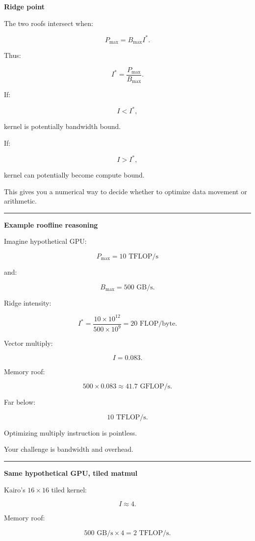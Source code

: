 \textbf{Ridge point}

The two roofs intersect when:

\[
P_{\max}
=
B_{\max}I^*.
\]

Thus:

\[
\boxed{
I^*
=
\frac{
P_{\max}
}{
B_{\max}
}.
}
\]

If:

\[
I<I^*,
\]

kernel is potentially bandwidth bound.

If:

\[
I>I^*,
\]

kernel can potentially become compute bound.

This gives you a numerical way to decide whether to optimize data movement or arithmetic.

\begin{center}\rule{0.5\linewidth}{0.5pt}\end{center}

\textbf{Example roofline reasoning}

Imagine hypothetical GPU:

\[
P_{\max}=10\text{ TFLOP/s}
\]

and:

\[
B_{\max}=500\text{ GB/s}.
\]

Ridge intensity:

\[
I^*
=
\frac{
10\times10^{12}
}{
500\times10^9
}
=
20\text{ FLOP/byte}.
\]

Vector multiply:

\[
I=0.083.
\]

Memory roof:

\[
500\times0.083
\approx41.7\text{ GFLOP/s}.
\]

Far below:

\[
10\text{ TFLOP/s}.
\]

Optimizing multiply instruction is pointless.

Your challenge is bandwidth and overhead.

\begin{center}\rule{0.5\linewidth}{0.5pt}\end{center}

\textbf{Same hypothetical GPU, tiled matmul}

Kairo's \(16\times16\) tiled kernel:

\[
I\approx4.
\]

Memory roof:

\[
500\text{ GB/s}
\times
4
=
2\text{ TFLOP/s}.
\]

